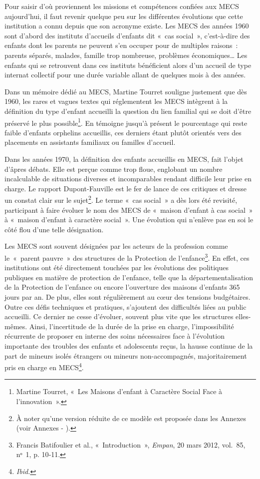 \documentclass[
  12,
  a4paper,
]{report}
\begin{document}
Pour saisir d'où proviennent les missions et compétences confiées aux
MECS aujourd'hui, il faut revenir quelque peu sur les différentes
évolutions que cette institution a connu depuis que son acronyme existe.
Les MECS des années 1960 sont d'abord des instituts d'accueils d'enfants
dit «~cas social~», c'est-à-dire des enfants dont les parents ne peuvent
s'en occuper pour de multiples raisons~: parents séparés, malades,
famille trop nombreuse, problèmes économiques\ldots{} Les enfants qui se
retrouvent dans ces instituts bénéficient alors d'un accueil de type
internat collectif pour une durée variable allant de quelques mois à des
années.

Dans un mémoire dédié au MECS, Martine Tourret souligne justement que
dès 1960, les rares et vagues textes qui réglementent les MECS intègrent
à la définition du type d'enfant accueilli la question du lien familial
qui se doit d'être préservé le plus possible\footnote{Martine Tourret,
  {«~Les {Maisons} d'enfant à Caractère Social Face à l'innovation~»}.}.
En témoigne jusqu'à présent le pourcentage qui reste faible d'enfants
orphelins accueillis, ces derniers étant plutôt orientés vers des
placements en assistants familiaux ou familles d'accueil.

Dans les années 1970, la définition des enfants accueillis en MECS, fait
l'objet d'âpres débats. Elle est perçue comme trop floue, englobant un
nombre incalculable de situations diverses et incomparables rendant
difficile leur prise en charge. Le rapport Dupont-Fauville est le fer de
lance de ces critiques et dresse un constat clair sur le
sujet\footnote{À noter qu'une version réduite de ce modèle est proposée
  dans les Annexes (voir Annexes - ).}. Le terme «~cas social~» a dès
lors été revisité, participant à faire évoluer le nom des MECS de
«~maison d'enfant à cas social~» à «~maison d'enfant à caractère
social~». Une évolution qui n'enlève pas en soi le côté flou d'une telle
désignation.

Les MECS sont souvent désignées par les acteurs de la profession comme
le~«~parent pauvre~» des structures de la Protection de
l'enfance\footnote{Francis Batifoulier et al., {«~Introduction~»},
  \emph{Empan}, 20 mars 2012, vol.~85, nᵒ~1, p. 10‑11.}. En effet, ces
institutions ont été directement touchées par les évolutions des
politiques publiques en matière de protection de l'enfance, telle que la
départementalisation de la Protection de l'enfance ou encore l'ouverture
des maisons d'enfants 365 jours par an. De plus, elles sont
régulièrement au cœur des tensions budgétaires. Outre ces défis
techniques et pratiques, s'ajoutent des difficultés liées au public
accueilli. Ce dernier ne cesse d'évoluer, souvent plus vite que les
structures elles-mêmes. Ainsi, l'incertitude de la durée de la prise en
charge, l'impossibilité récurrente de proposer en interne des soins
nécessaires face à l'évolution importante des troubles des enfants et
adolescents reçus, la hausse continue de la part de mineurs isolés
étrangers ou mineurs non-accompagnés, majoritairement pris en charge en
MECS\footnote{\emph{Ibid.}}.
\end{document}
